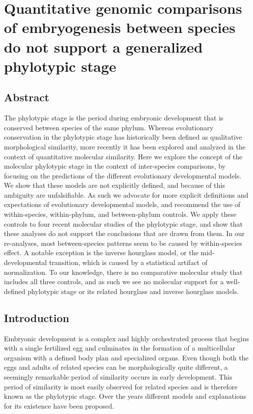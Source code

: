 \chapter{Quantitative genomic comparisons of embryogenesis between species do not support a generalized phylotypic stage}\thumbforchapter
{}
\newpage

\section{Abstract}

The phylotypic stage is the period during embryonic development that is conserved between species of the same phylum. Whereas evolutionary conservation in the phylotypic stage has historically been defined as qualitative morphological similarity, more recently it has been explored and analyzed in the context of quantitative molecular similarity. Here we explore the concept of the molecular phylotypic stage in the context of inter-species comparisons, by focusing on the predictions of the different evolutionary developmental models. We show that these models are not explicitly defined, and because of this ambiguity are unfalsifiable. As such we advocate for more explicit definitions and expectations of evolutionary developmental models, and recommend the use of within-species, within-phylum, and between-phylum controls. We apply these controls to four recent molecular studies of the phylotypic stage, and show that these analyses do not support the conclusions that are drawn from them. In our re-analyses, most between-species patterns seem to be caused by within-species effect. A notable exception is the inverse hourglass model, or the mid-developmental transition, which is caused by a statistical artifact of normalization. To our knowledge, there is no comparative molecular study that includes all three controls, and as such we see no molecular support for a well-defined phylotypic stage or its related hourglass and inverse hourglass models.

\section{Introduction}

Embryonic development is a complex and highly orchestrated process that begins with a single fertilized egg and culminates in the formation of a multicellular organism with a defined body plan and specialized organs. Even though both the eggs and adults of related species can be morphologically quite different, a seemingly remarkable period of similarity occurs in early development. This period of similarity is most easily observed for related species and is therefore known as the phylotypic stage. Over the years different models and explanations for its existence have been proposed\cite{Kalinka2012,Irie2014,Drost2017}.

